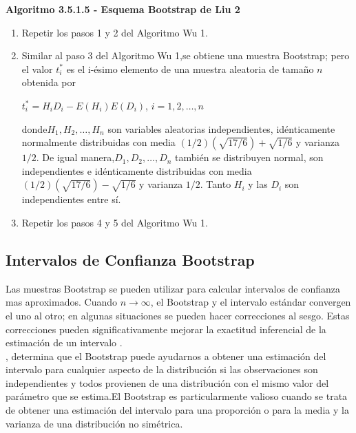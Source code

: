 \textbf{Algoritmo 3.5.1.5 - Esquema Bootstrap de Liu 2}

\begin{enumerate}
	\item Repetir los pasos 1 y 2 del Algoritmo Wu 1.
	
	\item  Similar al paso 3 del Algoritmo Wu 1,se obtiene una muestra Bootstrap;
	pero el valor $t^{*}_{i}$ es el i-ésimo elemento de una muestra aleatoria de tamaño $n$ obtenida por 
	
	\begin{center}
		$t^{*}_{i} = H_{i}D_{i}- E(H_{i})E(D_{i})$,\hspace{.5cm} $i = 1,2, \dots, n$
	\end{center}
	
	donde$ H_{1},H_{2}, \dots,H_{n}$ son variables aleatorias independientes, idénticamente normalmente distribuidas con media $(1/2)( \sqrt{17/6})+ \sqrt{1/6}$ y varianza $1/2$. De igual manera,$ D_{1},D_{2}, \dots,D_{n}$ también se distribuyen normal, son independientes e idénticamente
	distribuidas con media $(1/2)( \sqrt{17/6})- \sqrt{1/6}$ y varianza  $1/2$. Tanto $ H_{i}$ y las $ D_{i}$ son independientes entre sí.
	
	\item Repetir los pasos 4 y 5 del Algoritmo Wu 1.
\end{enumerate}



\subsection{Intervalos de Confianza Bootstrap}
Las muestras Bootstrap se pueden utilizar para calcular intervalos de confianza mas aproximados. Cuando $n \rightarrow \infty$, el Bootstrap y el intervalo estándar convergen el uno al otro; en algunas situaciones se pueden hacer correcciones al sesgo. Estas correcciones pueden significativamente mejorar la exactitud inferencial de la estimación de un intervalo \parencite{efron-tibs-1993}.\\


\textcite{good-2005}, determina que el Bootstrap puede ayudarnos a obtener una estimación del intervalo para cualquier aspecto de la distribución si las observaciones son independientes y todos provienen de una distribución con el mismo valor del parámetro que se estima.El Bootstrap es particularmente valioso cuando se trata de obtener una estimación del intervalo para una proporción o para la media y la varianza de una distribución no simétrica.\\


